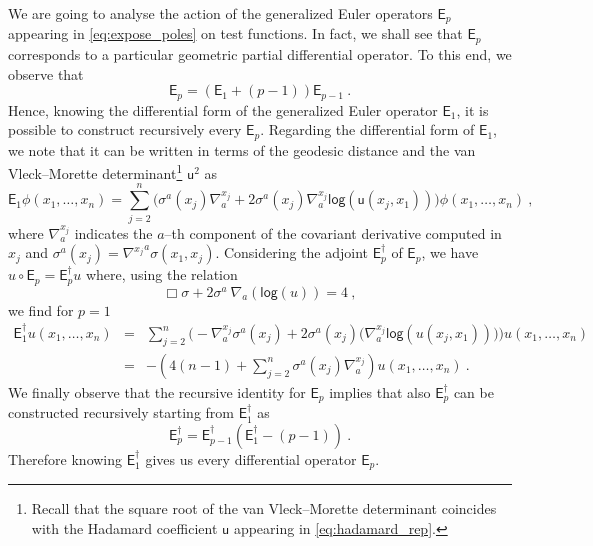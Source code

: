 \documentclass[11pt]{book}
\renewcommand{\log}{\mathsf{log}}
\newcommand{\Esf}{\mathsf{E}}
\newcommand{\usf}{\mathsf{u}}
\theoremstyle{break}
\begin{document}
We are going to analyse the action of the generalized Euler operators $\Esf_p$ appearing in \eqref{eq:expose_poles} on test functions. In fact, we shall see that $\Esf_p$ corresponds to a particular geometric partial differential operator. To this end, we observe that
%
\begin{equation*}
\Esf_p = (\Esf_1 + (p-1)) \Esf_{p-1} \ . 
\end{equation*}
%
Hence, knowing the differential form of the generalized Euler operator $\Esf_1$, it is possible to construct recursively every $\Esf_p$. Regarding the differential form of $\Esf_1$, we note that it can be written in terms of the geodesic distance and the van Vleck--Morette determinant\footnote{Recall that the square root of the van Vleck--Morette determinant coincides with the Hadamard coefficient $\usf$ appearing in \eqref{eq:hadamard_rep}.} $\usf^2$  as
%
\begin{equation*}
\Esf_1 \phi(x_1 , \dots , x_n) = \sum_{j=2}^n \bigg( \sigma^a(x_j) \nabla^{x_j}_a  + 2  \sigma^a(x_j) \nabla^{x_j}_a  \log\left(\usf(x_j,x_1)\right) \bigg) \phi(x_1 , \dots , x_n) \ , 
\end{equation*}
%
where $\nabla^{x_j}_a$ indicates the $a$--th component of the covariant derivative computed in $x_j$ and $\sigma^a(x_j) = {\nabla^{x_j}}^a \sigma(x_1,x_j)$. Considering the adjoint $\Esf^\dagger_p$ of $\Esf_p$, we have $u \circ \Esf_p = \Esf^\dagger_p u$ where, using the relation
\begin{equation*}
\Box \sigma + 2 \sigma^a \ \nabla_a\left( \log (u) \right) = 4 \ , 
\end{equation*}
%
we find for $p=1$
%
\begin{eqnarray}
\Esf_1^\dagger  u(x_1,\dots,x_n) &=& \sum_{j=2}^n \Bigg( - \nabla^{x_j}_a \sigma^a(x_j) + 2 \sigma^a(x_j) \bigg( \nabla^{x_j}_a \log\left(u(x_j,x_1)\right) \bigg) \Bigg) u(x_1,\dots,x_n) \nonumber \\
&=& -\left( 4(n-1) + \sum_{j=2}^n \sigma^a(x_j) \nabla^{x_j}_a \right) u(x_1,\dots,x_n) \ .
\label{eq:euler_operator}
\end{eqnarray}
%
We finally observe that the recursive identity for $\Esf_p$ implies that also $\Esf^\dagger_p$ can be constructed recursively starting from $\Esf^\dagger_1$ as 
%
\begin{equation*}
\Esf_p^\dagger = \Esf_{p-1}^\dagger \left(\Esf_1^\dagger-(p-1)\right) \ . 
\end{equation*}
%
Therefore knowing $\Esf_1^\dagger$ gives us every differential operator $\Esf_p$.
\end{document}
